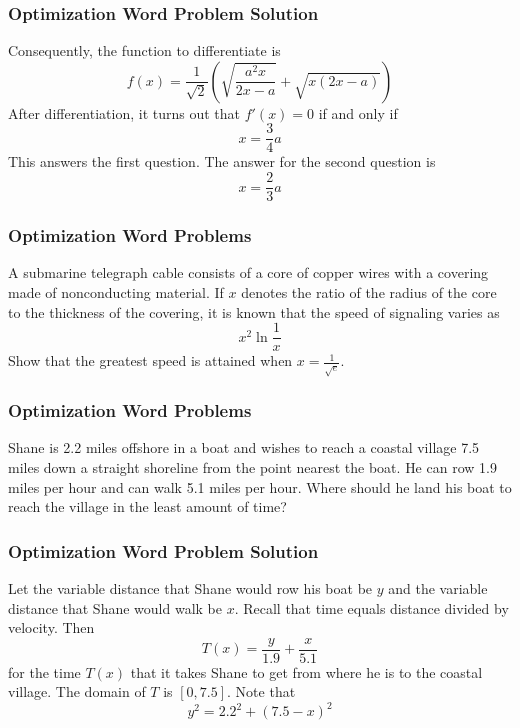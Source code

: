 \documentclass[xcolor=dvipsnames]{beamer}
\newcommand{\reeq}{2.2}
\newcommand{\aeza}{7.5}
\newcommand{\emah}{1.9}
\newcommand{\biet}{5.1}
\newcommand{\hohq}{Shane}
\newcommand{\wili}{He}
\newcommand{\ahhi}{he}
\newcommand{\bohh}{his}
\begin{document}
\begin{frame}
  \frametitle{Optimization Word Problem Solution}
  Consequently, the function to differentiate is
  \begin{equation}
    \label{eq:eeguyeex}
    f(x)=\frac{1}{\sqrt{2}}\left(\sqrt{\frac{a^{2}x}{2x-a}}+\sqrt{x(2x-a)}\right)
  \end{equation}
  After differentiation, it turns out that $f'(x)=0$ if and only if
  \begin{equation}
    \label{eq:shohyoom}
    x=\frac{3}{4}a
  \end{equation}
  This answers the first question. The answer for the second question is
  \begin{equation}
    \label{eq:zieshaiv}
    x=\frac{2}{3}a
  \end{equation}
\end{frame}

\begin{frame}
  \frametitle{Optimization Word Problems}
  {\ubung} A submarine telegraph cable consists of a core of copper
  wires with a covering made of nonconducting material. If $x$ denotes
  the ratio of the radius of the core to the thickness of the
  covering, it is known that the speed of signaling varies as
  \begin{equation}
    \label{eq:ehielush}
    x^{2}\ln\frac{1}{x}
  \end{equation}
Show that the greatest speed is attained when $x=\frac{1}{\sqrt{e}}$.
\end{frame}

\begin{frame}
  \frametitle{Optimization Word Problems}
  {\ubung} {\hohq} is {\reeq} miles offshore in a boat and wishes to
  reach a coastal village {\aeza} miles down a straight shoreline from
  the point nearest the boat. {\wili} can row {\emah} miles per hour
  and can walk {\biet} miles per hour. Where should {\ahhi} land
  {\bohh} boat to reach the village in the least amount of time?
\end{frame}

\begin{frame}
  \frametitle{Optimization Word Problem Solution}
Let the variable distance that Shane would row his boat be $y$ and the
variable distance that Shane would walk be $x$. Recall that time
equals distance divided by velocity. Then
\begin{equation}
  \label{eq:chahghei}
  T(x)=\frac{y}{1.9}+\frac{x}{5.1}
\end{equation}
for the time $T(x)$ that it takes Shane to get from where he is to the
coastal village. The domain of $T$ is $[0,7.5]$. Note that
\begin{equation}
  \label{eq:oofoopoh}
  y^{2}=2.2^{2}+(7.5-x)^{2}
\end{equation}
\end{frame}
\end{document}
